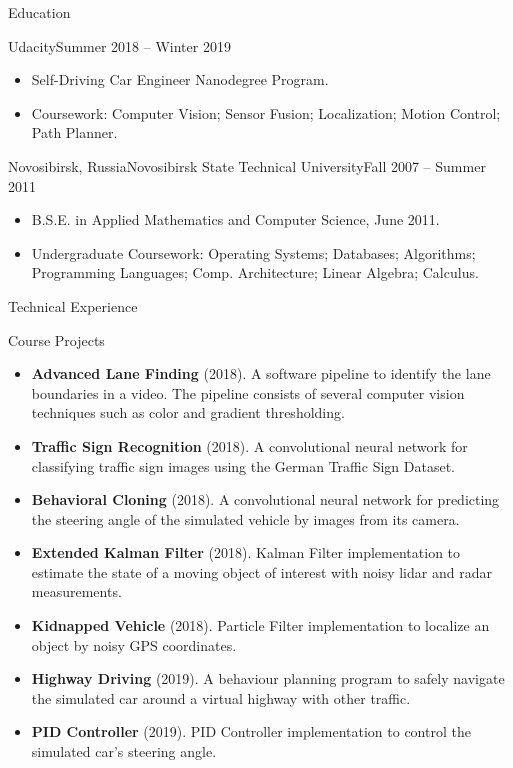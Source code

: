 \documentclass[]{cv}
\begin{document}
	\begin{cvsection}{Education}
    \begin{cvsubsection}{Udacity}{}{Summer 2018 -- Winter 2019}
			\begin{itemize}
				\item Self-Driving Car Engineer Nanodegree Program.
				\item Coursework: Computer Vision; Sensor Fusion; Localization; Motion Control; Path Planner.
			\end{itemize}
		\end{cvsubsection}
		\begin{cvsubsection}{Novosibirsk, Russia}{Novosibirsk State Technical University}{Fall 2007 -- Summer 2011}
			\begin{itemize}
				\item B.S.E. in Applied Mathematics and Computer Science, June 2011.
				\item Undergraduate Coursework: Operating Systems; Databases; Algorithms; Programming Languages; Comp. Architecture; Linear Algebra; Calculus.
			\end{itemize}
		\end{cvsubsection}
	\end{cvsection}

	\begin{cvsection}{Technical Experience}
		\begin{cvsubsection}{Course Projects}{}{}
			\begin{itemize}
				\item \textbf{Advanced Lane Finding} (2018). A software pipeline to identify the lane boundaries in a video. The pipeline consists of several computer vision techniques such as color and gradient thresholding.
				\item \textbf{Traffic Sign Recognition} (2018). A convolutional neural network for classifying traffic sign images using the German Traffic Sign Dataset.
				\item \textbf{Behavioral Cloning} (2018). A convolutional neural network for predicting the steering angle of the simulated vehicle by images from its camera.
				\item \textbf{Extended Kalman Filter} (2018). Kalman Filter implementation to estimate the state of a moving object of interest with noisy lidar and radar measurements.
				\item \textbf{Kidnapped Vehicle} (2018). Particle Filter implementation to localize an object by noisy GPS coordinates.
				\item \textbf{Highway Driving} (2019). A behaviour planning program to safely navigate the simulated car around a virtual highway with other traffic.
				\item \textbf{PID Controller} (2019). PID Controller implementation to control the simulated car's steering angle.
			\end{itemize}
		\end{cvsubsection}
	\end{cvsection}
\end{document}
